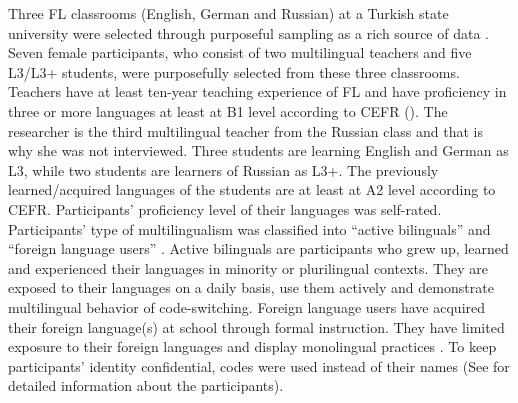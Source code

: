 \documentclass[output=paper]{../langscibook}
\begin{document}
Three FL classrooms (English, German and Russian) at a Turkish state university were selected through purposeful sampling as a rich source of data \citep{Patton2002}. Seven female participants, who consist of two multilingual teachers and five L3/L3+ students, were purposefully selected from these three classrooms. Teachers have at least ten-year teaching experience of FL and have proficiency in three or more languages at least at B1 level according to CEFR (\citealt{CouncilOfEurope2001}). The researcher is the third multilingual teacher from the Russian class and that is why she was not interviewed. Three students are learning English and German as L3, while two students are learners of Russian as L3+. The previously learned/acquired languages of the students are at least at A2 level according to CEFR.  Participants’ proficiency level of their languages was self-rated. Participants’ type of multilingualism was classified into “active bilinguals” and “foreign language users” \citep[82]{Cenoz2013b}. Active bilinguals are participants who grew up, learned and experienced their languages in minority or plurilingual contexts. They are exposed to their languages on a daily basis, use them actively and demonstrate multilingual behavior of code-switching. Foreign language users have acquired their foreign language(s) at school through formal instruction. They have limited exposure to their foreign languages and display monolingual practices \citep[82]{Cenoz2013b}. To keep participants’ identity confidential, codes were used instead of their names (See  for detailed information about the participants).
\end{document}
